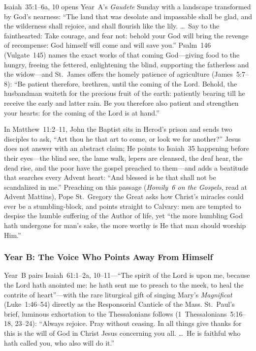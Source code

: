 Isaiah~35:1--6a, 10 opens Year~A's \textit{Gaudete} Sunday with a landscape transformed by God's nearness: ``The land that was desolate and impassable shall be glad, and the wilderness shall rejoice, and shall flourish like the lily. \dots\ Say to the fainthearted: Take courage, and fear not: behold your God will bring the revenge of recompense: God himself will come and will save you.'' Psalm~146 (Vulgate~145) names the exact works of that coming God---giving food to the hungry, freeing the fettered, enlightening the blind, supporting the fatherless and the widow---and St.~James offers the homely patience of agriculture (James~5:7--8): ``Be patient therefore, brethren, until the coming of the Lord. Behold, the husbandman waiteth for the precious fruit of the earth: patiently bearing till he receive the early and latter rain. Be you therefore also patient and strengthen your hearts: for the coming of the Lord is at hand.''

In Matthew~11:2--11, John the Baptist sits in Herod's prison and sends two disciples to ask, ``Art thou he that art to come, or look we for another?'' Jesus does not answer with an abstract claim; He points to Isaiah~35 happening before their eyes---the blind see, the lame walk, lepers are cleansed, the deaf hear, the dead rise, and the poor have the gospel preached to them---and adds a beatitude that searches every Advent heart: ``And blessed is he that shall not be scandalized in me.'' Preaching on this passage (\textit{Homily~6 on the Gospels}, read at Advent Mattins), Pope St.~Gregory the Great asks how Christ's miracles could ever be a stumbling-block, and points straight to Calvary: men are tempted to despise the humble suffering of the Author of life, yet ``the more humbling God hath undergone for man's sake, the more worthy is He that man should worship Him.''

\subsubsection{Year B: The Voice Who Points Away From Himself}

Year~B pairs Isaiah~61:1--2a, 10--11---``The spirit of the Lord is upon me, because the Lord hath anointed me: he hath sent me to preach to the meek, to heal the contrite of heart''---with the rare liturgical gift of singing Mary's \textit{Magnificat} (Luke~1:46--54) directly as the Responsorial Canticle of the Mass. St.~Paul's brief, luminous exhortation to the Thessalonians follows (1~Thessalonians~5:16--18, 23--24): ``Always rejoice. Pray without ceasing. In all things give thanks for this is the will of God in Christ Jesus concerning you all. \dots\ He is faithful who hath called you, who also will do it.''

